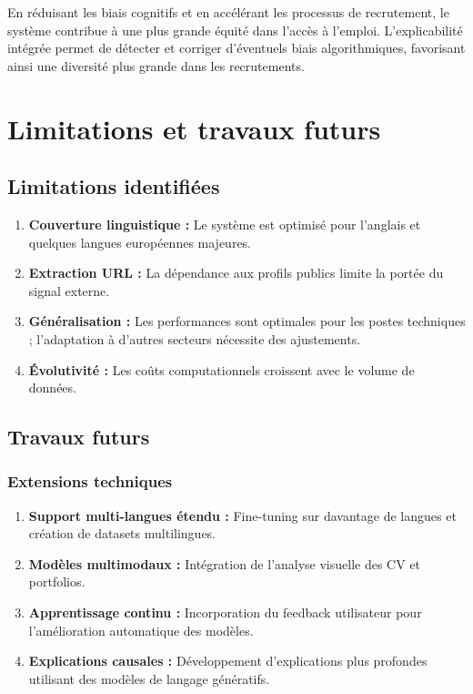 \documentclass[12pt,a4paper]{report}
\begin{document}
En réduisant les biais cognitifs et en accélérant les processus de recrutement, le système contribue à une plus grande équité dans l'accès à l'emploi. L'explicabilité intégrée permet de détecter et corriger d'éventuels biais algorithmiques, favorisant ainsi une diversité plus grande dans les recrutements.

\section{Limitations et travaux futurs}

\subsection{Limitations identifiées}

\begin{enumerate}
\item {\color{darkgreen}\textbf{Couverture linguistique :}} Le système est optimisé pour l'anglais et quelques langues européennes majeures.

\item {\color{primarygreen}\textbf{Extraction URL :}} La dépendance aux profils publics limite la portée du signal externe.

\item {\color{darkgreen}\textbf{Généralisation :}} Les performances sont optimales pour les postes techniques ; l'adaptation à d'autres secteurs nécessite des ajustements.

\item {\color{primarygreen}\textbf{Évolutivité :}} Les coûts computationnels croissent avec le volume de données.
\end{enumerate}

\subsection{Travaux futurs}

\subsubsection{Extensions techniques}

\begin{enumerate}
\item {\color{darkgreen}\textbf{Support multi-langues étendu :}} Fine-tuning sur davantage de langues et création de datasets multilingues.

\item {\color{primarygreen}\textbf{Modèles multimodaux :}} Intégration de l'analyse visuelle des CV et portfolios.

\item {\color{darkgreen}\textbf{Apprentissage continu :}} Incorporation du feedback utilisateur pour l'amélioration automatique des modèles.

\item {\color{primarygreen}\textbf{Explications causales :}} Développement d'explications plus profondes utilisant des modèles de langage génératifs.
\end{enumerate}
\end{document}
